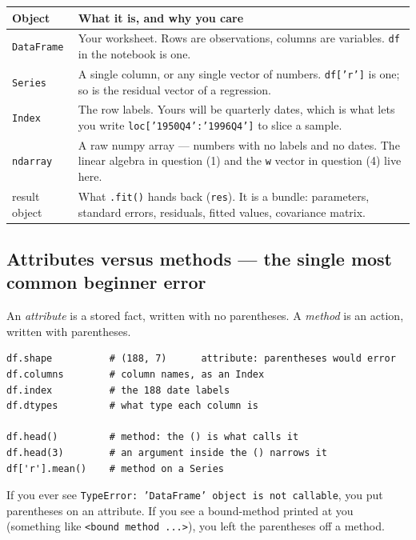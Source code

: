 \documentclass[11pt]{article}
\newcommand{\code}[1]{\texttt{#1}}
\begin{document}
\begin{center}
\begin{tabular}{@{}p{2.5cm}p{12.9cm}@{}}
\toprule
\textbf{Object} & \textbf{What it is, and why you care} \\
\midrule
\code{DataFrame} & Your worksheet. Rows are observations, columns are variables.
  \code{df} in the notebook is one. \\
\code{Series} & A single column, or any single vector of numbers.
  \code{df['r']} is one; so is the residual vector of a regression. \\
\code{Index} & The row labels. Yours will be quarterly dates, which is what lets
  you write \code{loc['1950Q4':'1996Q4']} to slice a sample. \\
\code{ndarray} & A raw numpy array --- numbers with no labels and no dates.
  The linear algebra in question (1) and the \code{w} vector in question (4)
  live here. \\
result object & What \code{.fit()} hands back (\code{res}). It is a bundle:
  parameters, standard errors, residuals, fitted values, covariance matrix. \\
\bottomrule
\end{tabular}
\end{center}

\subsection{Attributes versus methods --- the single most common beginner error}

An \emph{attribute} is a stored fact, written with no parentheses. A
\emph{method} is an action, written with parentheses.

\begin{lstlisting}
df.shape          # (188, 7)      attribute: parentheses would error
df.columns        # column names, as an Index
df.index          # the 188 date labels
df.dtypes         # what type each column is

df.head()         # method: the () is what calls it
df.head(3)        # an argument inside the () narrows it
df['r'].mean()    # method on a Series
\end{lstlisting}

\noindent If you ever see \code{TypeError: 'DataFrame' object is not callable},
you put parentheses on an attribute. If you see a bound-method printed at you
(something like \code{<bound method ...>}), you left the parentheses off a method.
\end{document}
